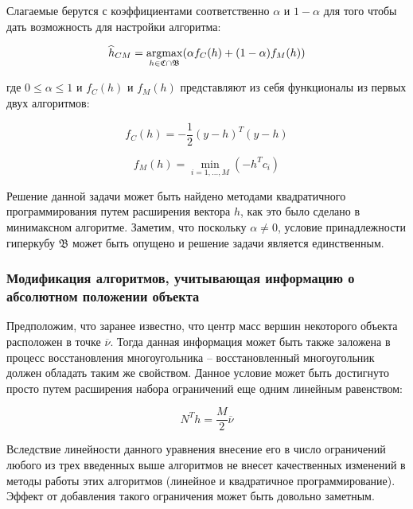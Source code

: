 \documentclass[a4paper, 12pt, titlepage]{article}
\theoremstyle{definition}
\theoremstyle{plain}
\theoremstyle{plain}
\begin{document}
Слагаемые берутся с коэффициентами соответственно $\alpha$ и $1 - \alpha$ для
того чтобы дать возможность для настройки алгоритма:

\begin{equation}
\widehat{h}_{CM} =
\operatornamewithlimits{argmax}_{h \in \mathfrak{C} \cap \mathfrak{B}}
(\alpha f_{C}(h) + (1 - \alpha) f_{M}(h))
\end{equation}

где $0 \leq \alpha \leq 1$ и $f_{C}(h)$ и $f_{M}(h)$ представляют из себя
функционалы из первых двух алгоритмов:

\begin{equation}
f_{C}(h) = - \frac{1}{2} (y - h)^{T} (y - h)
\end{equation}

\begin{equation}
f_{M}(h) = \min_{i = 1, \ldots, M} (- h^{T} c_{i})
\end{equation}

Решение данной задачи может быть найдено методами квадратичного
программирования путем расширения вектора $h$, как это было сделано в
минимаксном алгоритме. Заметим, что поскольку $\alpha \neq 0$, условие
принадлежности гиперкубу $\mathfrak{B}$ может быть опущено и решение задачи
является единственным.

\subsubsection{Модификация алгоритмов, учитывающая информацию о абсолютном
положении объекта}

Предположим, что заранее известно, что центр масс вершин некоторого объекта
расположен в точке $\overline{\nu}$. Тогда данная информация может быть также
заложена в процесс восстановления многоугольника -- восстановленный
многоугольник должен обладать таким же свойством. Данное условие может быть
достигнуто просто путем расширения набора ограничений еще одним линейным
равенством:

\begin{equation}
N^{T} h = \frac{M}{2} \overline{\nu}
\end{equation}

Вследствие линейности данного уравнения внесение его в число ограничений любого
из трех введенных выше алгоритмов не внесет качественных изменений в методы
работы этих алгоритмов (линейное и квадратичное программирование). Эффект от
добавления такого ограничения может быть довольно заметным.
\end{document}
